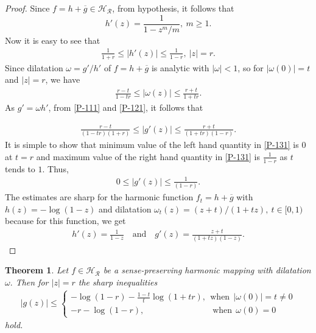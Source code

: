 \documentclass[a4paper,12pt]{amsart}
\newtheorem{thm}{Theorem}[section]
\theoremstyle{definition}
\begin{document}
	\begin{proof}
 Since $f=h+\overline{g}\in\mathcal{H_R}$, from hypothesis, it follows that
 $$h'(z)=\frac{1}{1-z^m/m},~m\ge 1.$$ Now it is easy to see that
 \begin{align}\label{P-111}
 \frac{1}{1+r}\le|h'(z)|\le\frac{1}{1-r},~ |z|=r.
 \end{align}
 Since dilatation $\omega=g'/h'$ of $f=h+\overline{g}$ is analytic with $|\omega|<1$, so for $|\omega(0)|=t$ and $|z|=r$, we have
 \begin{align}\label{P-121}
 	\frac{r-t}{1-tr}\le |\omega(z)|\le \frac{r+t}{1+tr}.
 \end{align}
 As $g'=\omega h'$, from \eqref{P-111} and \eqref{P-121}, it follows that 
 
  \begin{align}\label{P-131}
 	\frac{r-t}{(1-tr)(1+r)}\le |g'(z)|\le \frac{r+t}{(1+tr)(1-r)}.
 \end{align}
It is simple to show that minimum value of the left hand quantity in \eqref{P-131} is $0$ at $t=r$ and maximum value of the right hand quantity in \eqref{P-131} is $\frac{1}{1-r}$ as $t$ tends to $1.$ Thus,
\begin{align*}
	0\leq |g'(z)|\leq\frac{1}{(1-r)}.
\end{align*}
 The estimates are sharp for the harmonic function $f_t=h+\overline{g}$ with $h(z)=-\log{(1-z)}$ and dilatation $\omega_t(z)=(z+t)/(1+t z),~t\in[0,1)$ because for this function, we get
 \begin{align*}
 h'(z)=\frac{1}{1-z}\quad\text{and}\quad	g'(z)=\frac{z+t}{(1+t z)(1-z)}.
 \end{align*}

	\end{proof}
	\begin{thm}\label{log-000200}
		Let $f\in\mathcal{H_R}$ be a sense-preserving harmonic mapping with dilatation $\omega.$ Then for $|z|=r$ the sharp inequalities
		\begin{align*}
			|g(z)|\le
			\begin{cases}
				-\log{(1-r)}-\frac{1-t}{t}\log{(1+tr)}  ,~~\text{when}~~|\omega(0)|=t\neq 0 \\
				 -r-\log{(1-r)},\quad\quad\quad\quad\quad\quad\quad\quad\text{when}~~\omega(0)=0
			\end{cases}
		\end{align*}
		hold.
	\end{thm}
\end{document}
